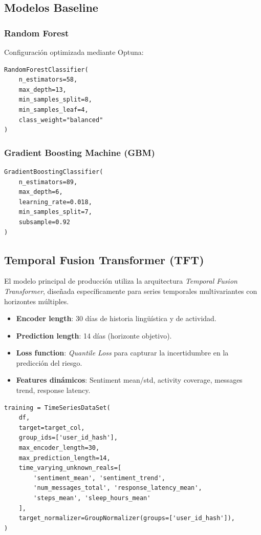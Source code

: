 \documentclass[11pt,a4paper]{article}
\begin{document}
\subsection{Modelos Baseline}

\subsubsection{Random Forest}

Configuración optimizada mediante Optuna:

\begin{lstlisting}
RandomForestClassifier(
    n_estimators=58,
    max_depth=13,
    min_samples_split=8,
    min_samples_leaf=4,
    class_weight="balanced"
)
\end{lstlisting}

\subsubsection{Gradient Boosting Machine (GBM)}

\begin{lstlisting}
GradientBoostingClassifier(
    n_estimators=89,
    max_depth=6,
    learning_rate=0.018,
    min_samples_split=7,
    subsample=0.92
)
\end{lstlisting}

\subsection{Temporal Fusion Transformer (TFT)}

El modelo principal de producción utiliza la arquitectura \textit{Temporal Fusion Transformer}, diseñada específicamente para series temporales multivariantes con horizontes múltiples.

\begin{itemize}
    \item \textbf{Encoder length}: 30 días de historia lingüística y de actividad.
    \item \textbf{Prediction length}: 14 días (horizonte objetivo).
    \item \textbf{Loss function}: \textit{Quantile Loss} para capturar la incertidumbre en la predicción del riesgo.
    \item \textbf{Features dinámicos}: Sentiment mean/std, activity coverage, messages trend, response latency.
\end{itemize}

\begin{lstlisting}[caption={Configuración del dataset TFT}]
training = TimeSeriesDataSet(
    df,
    target=target_col,
    group_ids=['user_id_hash'],
    max_encoder_length=30,
    max_prediction_length=14,
    time_varying_unknown_reals=[
        'sentiment_mean', 'sentiment_trend',
        'num_messages_total', 'response_latency_mean',
        'steps_mean', 'sleep_hours_mean'
    ],
    target_normalizer=GroupNormalizer(groups=['user_id_hash']),
)
\end{lstlisting}
\end{document}
